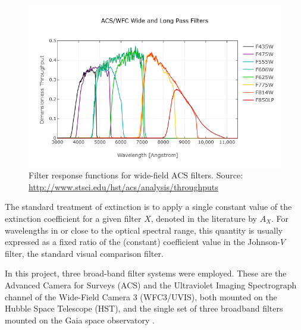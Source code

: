 \documentclass[12pt, a4paper]{report}
\begin{document}
\begin{figure}[h]
\begin{center}
\includegraphics[scale=0.5]{ACS_Wide.png}
\caption{Filter response functions for wide-field ACS filters. Source: \protect\url{http://www.stsci.edu/hst/acs/analysis/throughputs}}
\label{ACS_response_funcs}
\end{center}
\end{figure}

The standard treatment of extinction is to apply a single constant value of the extinction coefficient for a given filter $X$, denoted in the literature by $A_{X}$. For wavelengths in or close to the optical spectral range, this quantity is usually expressed as a fixed ratio of the (constant) coefficient value in the Johnson-$V$ filter, the standard visual comparison filter.

In this project, three broad-band filter systems were employed. These are the Advanced Camera for Surveys (ACS) and the Ultraviolet Imaging Spectrograph channel of the Wide-Field Camera 3 (WFC3/UVIS), both mounted on the Hubble Space Telescope (HST), and the single set of three broadband filters mounted on the Gaia space observatory \citep{2010A&A...523A..48J}.
\end{document}
